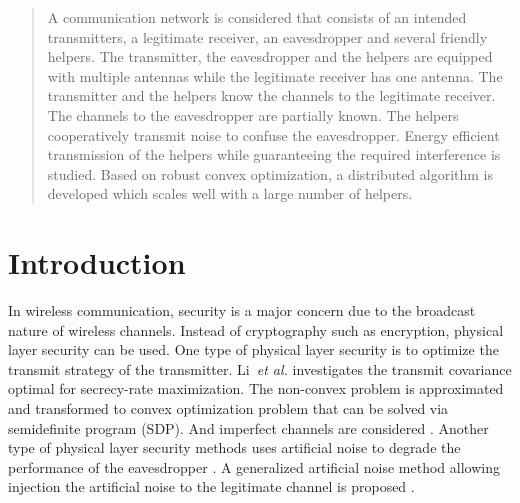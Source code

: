 \documentclass[journal]{IEEEtran}
\begin{document}




\maketitle

\begin{abstract}
A communication network is considered that consists of an intended  transmitters, a legitimate receiver, an eavesdropper and several friendly helpers. The transmitter, the eavesdropper and the helpers  are equipped with multiple antennas while the legitimate receiver has one antenna.  The transmitter and the helpers know the channels to the legitimate receiver. The channels to the eavesdropper are partially known. The helpers cooperatively transmit noise to confuse the eavesdropper. Energy efficient transmission of the helpers while guaranteeing the required interference is studied.  Based on robust convex optimization, a distributed algorithm is developed which scales well with a large number of helpers. 
\end{abstract}





%
\IEEEpeerreviewmaketitle



\section{Introduction}

In wireless communication, security is a major concern due to the broadcast nature of wireless channels. Instead of cryptography such as encryption, physical layer security can be used.
One type of physical layer security is to optimize the transmit strategy of the transmitter. Li~\emph{et al.} investigates the  transmit covariance optimal for secrecy-rate maximization. The non-convex problem is approximated and transformed to convex optimization problem that can be solved via semidefinite program (SDP). And imperfect channels are considered \cite{li_optimal_2011}.
Another type of physical layer security methods uses artificial noise to degrade the performance of the eavesdropper \cite{Goel_an_2008}. A generalized artificial noise method allowing injection the artificial noise to the legitimate channel is proposed \cite{lin2013secrecy}.
\end{document}
